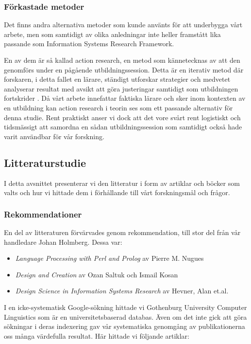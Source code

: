 \documentclass[swedish]{maucsthesis}
\begin{document}
\subsubsection{Förkastade metoder}
Det finns andra alternativa metoder som kunde använts för att underbygga vårt
arbete, men som samtidigt av olika anledningar inte heller framstått lika
passande som Information Systems Research Framework.

En av dem är så kallad action research, en metod som kännetecknas av att den
genomförs under en pågående utbildningssession. Detta är en iterativ metod där
forskaren, i detta fallet en lärare, ständigt utforskar strategier och medvetet
analyserar resultat med avsikt att göra justeringar samtidigt som utbildningen
fortskrider \cite{clement:2004}. Då vårt arbete innefattar faktiska lärare och
sker inom kontexten av en utbildning kan action research i teorin ses som ett
passande alternativ för denna studie. Rent praktiskt anser vi dock att det vore
svårt rent logistiskt och tidsmässigt att samordna en sådan utbildningssession
som samtidigt också hade varit användbar för vår forskning.

\subsection{Litteraturstudie}\label{litteraturstudie}

I detta avsnittet presenterar vi den litteratur i form av artiklar och böcker
som valts och hur vi hittade dem i förhållande till vårt forskningsmål och
frågor.

\subsubsection{Rekommendationer}

En del av litteraturen förvärvades genom rekommendation, till stor del från vår
handledare Johan Holmberg. Dessa var:
\begin{itemize}
\item \textit{Language Processing with Perl and Prolog} av Pierre M. Nugues
\item \textit{Design and Creation} av Ozan Saltuk och Ismail Kosan
\item \textit{Design Science in Information Systems Research} av Hevner, Alan et.al.
\end{itemize}

I en icke-systematisk Google-sökning hittade vi Gothenburg University Computer
Linguistics som är en universitetsbaserad databas. Även om det inte gick att
göra sökningar i deras indexering gav vår systematiska genomgång av
publikationerna oss många värdefulla resultat. Här hittade vi följande artiklar:
\end{document}

